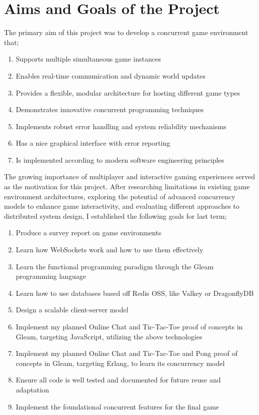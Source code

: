 \documentclass[]{final}
\begin{document}
\section{Aims and Goals of the Project}
The primary aim of this project was to develop a concurrent game environment that;
\begin{enumerate}
  \item Supports multiple simultaneous game instances
  \item Enables real-time communication and dynamic world updates
  \item Provides a flexible, modular architecture for hosting different game types
  \item Demonstrates innovative concurrent programming techniques
  \item Implements robust error handling and system reliability mechanisms
  \item Has a nice graphical interface with error reporting
  \item Is implemented according to modern software engineering principles
\end{enumerate}

\newpage

\label{rationale_importance}

The growing importance of multiplayer and interactive gaming experiences served
as the motivation for this project. After researching limitations in existing
game environment architectures, exploring the potential of advanced
concurrency models to enhance game interactivity, and evaluating different
approaches to distributed system design, I established the following goals
for last term;

\begin{enumerate}
  \item Produce a survey report on game environments
  \item Learn how WebSockets work and how to use them effectively
  \item Learn the functional programming paradigm through the Gleam programming language
  \item Learn how to use databases based off Redis OSS, like Valkey or DragonflyDB
  \item Design a scalable client-server model
  \item Implement my planned Online Chat and Tic-Tac-Toe proof of concepts in Gleam, targeting JavaScript, utilizing the above technologies
  \item Implement my planned Online Chat and Tic-Tac-Toe and Pong proof of concepts in Gleam, targeting Erlang, to learn its concurrency model
  \item Ensure all code is well tested and documented for future reuse and adaptation
  \item Implement the foundational concurrent features for the final game
\end{enumerate}
\end{document}
